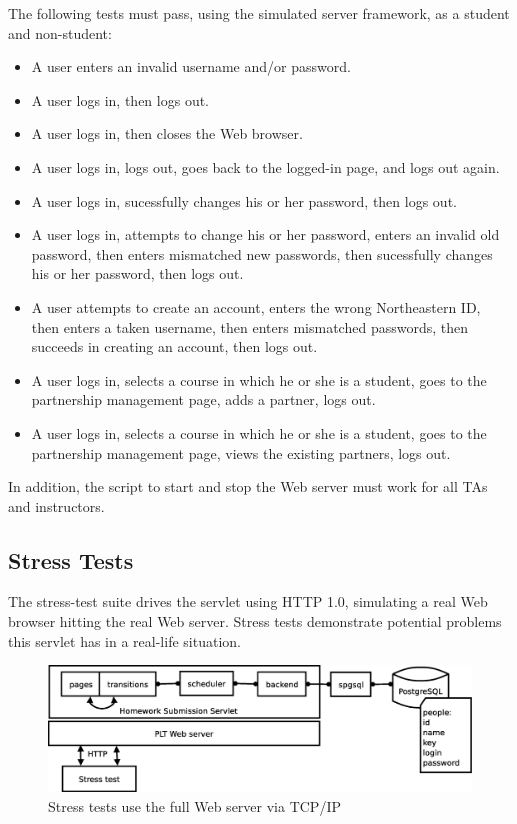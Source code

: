 \documentclass[a4paper]{article}
\begin{document}

The following tests must pass, using the simulated server framework, as a
student and non-student:

\begin{itemize}
\item{A user enters an invalid username and/or password.}
\item{A user logs in, then logs out.}
\item{A user logs in, then closes the Web browser.}
\item{A user logs in, logs out, goes back to the logged-in page, and logs out
  again.}
\item{A user logs in, sucessfully changes his or her password, then logs out.}
\item{A user logs in, attempts to change his or her password, enters an invalid
  old password, then enters mismatched new passwords, then sucessfully changes
  his or her password, then logs out.}
\item{A user attempts to create an account, enters the wrong Northeastern ID,
  then enters a taken username, then enters mismatched passwords, then succeeds
  in creating an account, then logs out.}
\item{A user logs in, selects a course in which he or she is a student, goes
  to the partnership management page, adds a partner, logs out.}
\item{A user logs in, selects a course in which he or she is a student, goes
  to the partnership management page, views the existing partners, logs out.}
\end{itemize}

In addition, the script to start and stop the Web server must work for all TAs
and instructors.

\subsection{Stress Tests}\label{subsec:stresstests}

The stress-test suite drives the servlet using HTTP 1.0, simulating a real Web
browser hitting the real Web server. Stress tests demonstrate potential
problems this servlet has in a real-life situation.

\begin{figure}[ht]
\centering
\includegraphics[scale=.30]{stress-test.eps}
\caption{Stress tests use the full Web server via TCP/IP}
\label{fig:stress-tests}
\end{figure}
\end{document}
